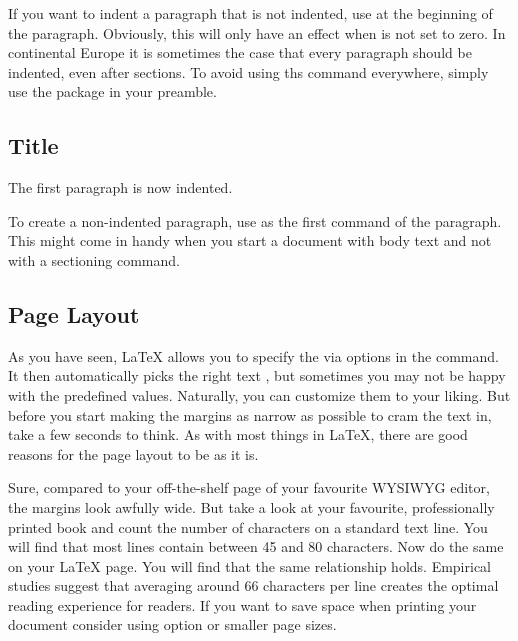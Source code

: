 If you want to indent a paragraph that is not indented, use  at the
beginning of the paragraph. Obviously, this will only have an effect when
 is not set to zero. In continental Europe it is sometimes the
case that every paragraph should be indented, even after sections. To avoid
using ths  command everywhere, simply use the 
package in your preamble.
\begin{example}[standalone, paperheight=2.5cm, paperwidth=0.5\linewidth]
\usepackage{indentfirst}

\section{Title}

The first paragraph is now
indented.
\end{example}

To create a non-indented paragraph, use  as the first command of
the paragraph. This might come in handy when you start a document with body
text and not with a sectioning command.

\subsection{Page Layout}\label{sec:page_layout}
\begingroup
{}
As you have seen, \LaTeX{} allows you to specify the  via
options in the  command. It then automatically picks the
right text , but sometimes you may not be happy with the predefined
values. Naturally, you can customize them to your liking. But before you start
making the margins as narrow as possible to cram the text in, take a few
seconds to think. As with most things in \LaTeX, there are good reasons for the
page layout to be as it is.

Sure, compared to your off-the-shelf page of your favourite WYSIWYG editor, the
margins look awfully wide. But take a look at your favourite, professionally
printed book and count the number of characters on a standard text line. You
will find that most lines contain between 45 and 80 characters. Now do the same
on your \LaTeX{} page. You will find that the same relationship holds.
Empirical studies suggest that averaging around 66 characters per line creates
the optimal reading experience for readers. If you want to save space when
printing your document consider using  option or smaller page
sizes.

